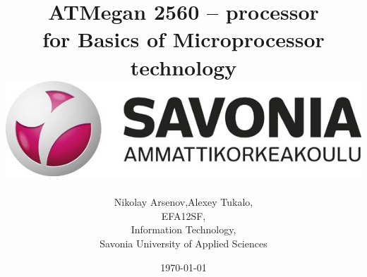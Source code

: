 \documentclass[english]{article}
\date{}
\begin{document}
\title{\vspace{2in}ATMegan 2560 – processor\\
\small for Basics of Microprocessor technology\\
\vspace{0.5in}\includegraphics{savonia.jpg}}

\nopagebreak
\maketitle


\vspace{3in}

\author{
\begin{flushright}
Nikolay Arsenov,Alexey Tukalo,\\
EFA12SF,\\
Information Technology,\\
Savonia University of Applied Sciences
\end{flushright}
}

\date{\today}
\thispagestyle{empty}

\newpage
\setcounter{page}{1}
\setcounter{tocdepth}{2}
\tableofcontents

\newpage
\end{document}
